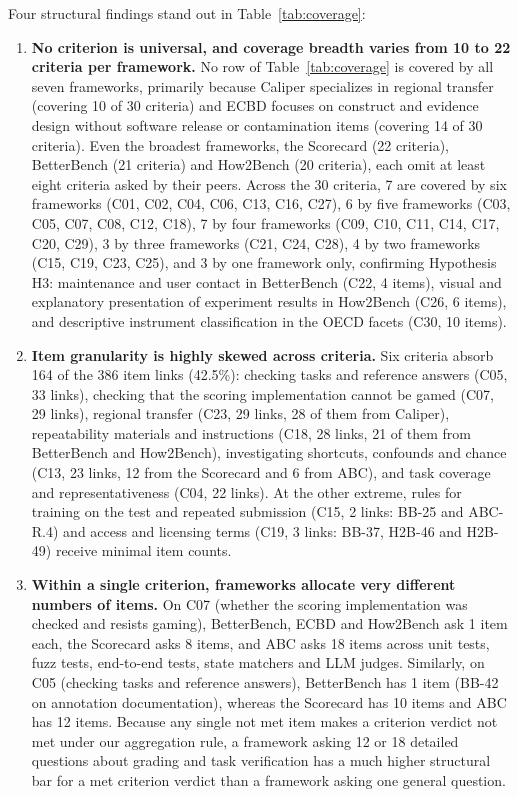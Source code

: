 \documentclass[10pt,conference]{IEEEtran}
\begin{document}
Four structural findings stand out in Table~\ref{tab:coverage}:
\begin{enumerate}
\item \textbf{No criterion is universal, and coverage breadth varies from 10 to 22 criteria per framework.} No row of Table~\ref{tab:coverage} is covered by all seven frameworks, primarily because Caliper specializes in regional transfer (covering 10 of 30 criteria) and ECBD focuses on construct and evidence design without software release or contamination items (covering 14 of 30 criteria). Even the broadest frameworks, the Scorecard (22 criteria), BetterBench (21 criteria) and How2Bench (20 criteria), each omit at least eight criteria asked by their peers. Across the 30 criteria, 7 are covered by six frameworks (C01, C02, C04, C06, C13, C16, C27), 6 by five frameworks (C03, C05, C07, C08, C12, C18), 7 by four frameworks (C09, C10, C11, C14, C17, C20, C29), 3 by three frameworks (C21, C24, C28), 4 by two frameworks (C15, C19, C23, C25), and 3 by one framework only, confirming Hypothesis H3: maintenance and user contact in BetterBench (C22, 4 items), visual and explanatory presentation of experiment results in How2Bench (C26, 6 items), and descriptive instrument classification in the OECD facets (C30, 10 items).
\item \textbf{Item granularity is highly skewed across criteria.} Six criteria absorb 164 of the 386 item links (42.5\%): checking tasks and reference answers (C05, 33 links), checking that the scoring implementation cannot be gamed (C07, 29 links), regional transfer (C23, 29 links, 28 of them from Caliper), repeatability materials and instructions (C18, 28 links, 21 of them from BetterBench and How2Bench), investigating shortcuts, confounds and chance (C13, 23 links, 12 from the Scorecard and 6 from ABC), and task coverage and representativeness (C04, 22 links). At the other extreme, rules for training on the test and repeated submission (C15, 2 links: BB-25 and ABC-R.4) and access and licensing terms (C19, 3 links: BB-37, H2B-46 and H2B-49) receive minimal item counts.
\item \textbf{Within a single criterion, frameworks allocate very different numbers of items.} On C07 (whether the scoring implementation was checked and resists gaming), BetterBench, ECBD and How2Bench ask 1 item each, the Scorecard asks 8 items, and ABC asks 18 items across unit tests, fuzz tests, end-to-end tests, state matchers and LLM judges. Similarly, on C05 (checking tasks and reference answers), BetterBench has 1 item (BB-42 on annotation documentation), whereas the Scorecard has 10 items and ABC has 12 items. Because any single not met item makes a criterion verdict not met under our aggregation rule, a framework asking 12 or 18 detailed questions about grading and task verification has a much higher structural bar for a met criterion verdict than a framework asking one general question.

\end{enumerate}
\end{document}
